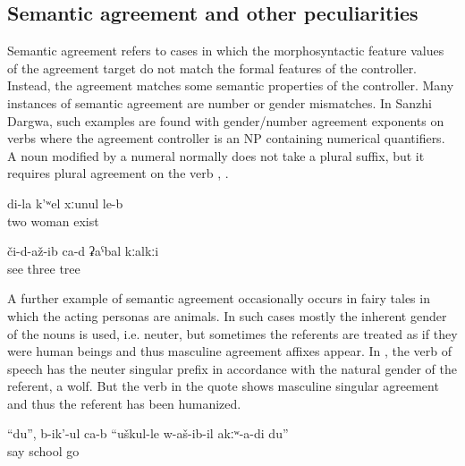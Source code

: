 
\subsection{Semantic agreement and other peculiarities}
\label{ssec:Semantic agreement and other deviations}

Semantic agreement refers to cases in which the morphosyntactic feature values of the agreement target do not match the formal features of the controller. Instead, the agreement matches some semantic properties of the controller. Many instances of semantic agreement are number or gender mismatches. In Sanzhi Dargwa, such examples are found with gender/number agreement exponents on verbs where the agreement controller is an NP containing numerical quantifiers. A noun modified by a numeral normally does not take a plural suffix, but it requires plural agreement on the verb , . 
%
\begin{exe}
	\ex	\label{ex:I have two wives@15}
	\gll	di-la	k'ʷel	xːunul	le-b\\
			two	woman	exist\\
	\glt	{}

	\ex	\label{ex:(He) saw three trees}
	\gll	či-d-až-ib	ca-d	ʡaˁbal	kːalkːi\\
		see		three	tree\\
	\glt	{}
\end{exe}

A further example of semantic agreement occasionally occurs in fairy tales in which the acting personas are animals. In such cases mostly the inherent gender of the nouns is used, i.e. neuter, but sometimes the referents are treated as if they were human beings and thus masculine agreement affixes appear. In , the verb of speech has the neuter singular prefix in accordance with the natural gender of the referent, a wolf. But the verb in the quote shows masculine singular agreement and thus the referent has been humanized.
%
\begin{exe}
	\ex	\label{ex:‎‎‎(The wolf) said, I did not go to school.}
	\gll	``du'',	b-ik'-ul	ca-b	``uškul-le	w-aš-ib-il	akːʷ-a-di	du''\\
			say		school	go		\\
	\glt	{}
\end{exe}

